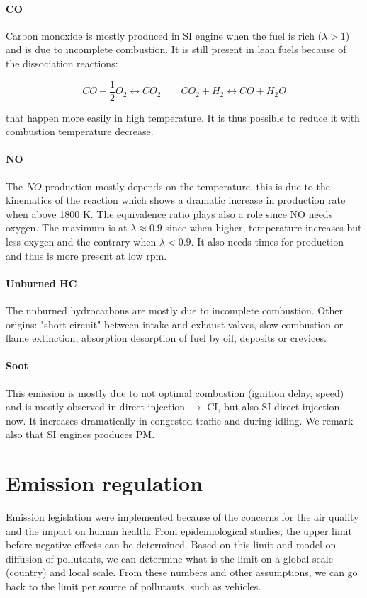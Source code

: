 \paragraph{CO}
	Carbon monoxide is mostly produced in SI engine when the fuel is rich ($\lambda > 1$) and is due to incomplete combustion. It is still present in lean fuels because of the dissociation reactions: 
	
	\begin{equation}
	CO + \frac{1}{2}O_2 \leftrightarrow CO_2 \qquad CO_2 + H_2 \leftrightarrow CO + H_2O
	\end{equation}
	
	that happen more easily in high temperature. It is thus possible to reduce it with combustion temperature decrease. 
	
\paragraph{NO} The $NO$ production mostly depends on the temperature, this is due to the kinematics of the reaction which shows a dramatic increase in production rate when above 1800 K. The equivalence ratio plays also a role since NO needs oxygen. The maximum is at $\lambda \approx 0.9$ since when higher, temperature increases but less oxygen and the contrary when $\lambda < 0.9$. It also needs times for production and thus is more present at low rpm. 

\paragraph{Unburned HC} The unburned hydrocarbons are mostly due to incomplete combustion. Other origins: "short circuit" between intake and exhaust valves, slow combustion or flame extinction, absorption desorption of fuel by oil, deposits or crevices. 

\paragraph{Soot} This emission is mostly due to not optimal combustion (ignition delay, speed) and is mostly observed in direct injection $\rightarrow$ CI, but also SI direct injection now. It increases dramatically in congested traffic and during idling. We remark also that SI engines produces PM. 

\section{Emission regulation}
	Emission legislation were implemented because of the concerns for the air quality and the impact on human health. From epidemiological studies, the upper limit before negative effects can be determined. Based on this limit and model on diffusion of pollutants, we can determine what is the limit on a global scale (country) and local scale. From these numbers and other assumptions, we can go back to the limit per source of pollutants, such as vehicles. \\
	
